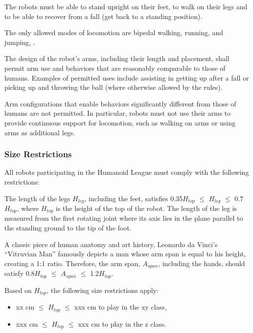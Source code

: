 The robots must be able to stand upright on their feet, to walk on their legs and to be able to recover from a fall (get back to a standing position). 

The only allowed modes of locomotion are bipedal walking, running, and jumping, .

The design of the robot's arms, including their length and placement, shall permit arm use and behaviors that are reasonably comparable to those of humans. Examples of permitted uses include  
assisting in getting up after a fall or picking up and throwing the ball (where otherwise allowed by the rules).

Arm configurations that enable behaviors significantly different from those of humans are not permitted. In particular, 
robots must not use their arms to provide continuous support for locomotion, such as walking on arms or using arms as additional legs.

\subsubsection{Size Restrictions}

All robots participating in the Humanoid League must comply with the following restrictions:

The length of the legs $H_{leg}$, including the feet, satisfies 0.35{\textperiodcentered}$H_{top}$ ${\leq}$ $H_{leg}$ ${\leq}$ 0.7{\textperiodcentered}$H_{top}$,  where $H_{top}$ is the height of the top of the robot. 
The length of the leg is measured from the first rotating joint where its axis lies in the plane parallel to the standing ground to the tip of the foot.

A classic piece of human anatomy and art history, Leonardo da Vinci’s “Vitruvian Man” famously depicts a man whose arm span is equal to his height, creating a 1:1 ratio. 
Therefore, the arm span, $A_{span}$, including the hands, should satisfy 0.8{\textperiodcentered}$H_{top}$ ${\leq}$ $A_{span}$ ${\leq}$ 1.2{\textperiodcentered}$H_{top}$.

Based on $H_{top}$, the following size restrictions apply:

\begin{itemize}
\item xx cm ${\leq}$ $H_{top}$ ${\leq}$ xxx cm to play in the xy class, 
\item xxx cm ${\leq}$ $H_{top}$ ${\leq}$ xxx cm to play in the z class.
\end{itemize}

